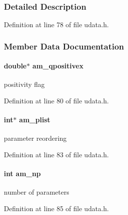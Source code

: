 \subsubsection{Detailed Description}


Definition at line 78 of file udata.\+h.



\subsubsection{Member Data Documentation}
\hypertarget{struct_user_data_a24dcfe2da485ad1964d807779fce2092}{}
\paragraph[{am\+\_\+qpositivex}]{\setlength{\rightskip}{0pt plus 5cm}double$\ast$ am\+\_\+qpositivex}\label{struct_user_data_a24dcfe2da485ad1964d807779fce2092}
positivity flag 

Definition at line 80 of file udata.\+h.

\hypertarget{struct_user_data_a122fcb4f213656e29d30e1e8713fcf1c}{}
\paragraph[{am\+\_\+plist}]{\setlength{\rightskip}{0pt plus 5cm}int$\ast$ am\+\_\+plist}\label{struct_user_data_a122fcb4f213656e29d30e1e8713fcf1c}
parameter reordering 

Definition at line 83 of file udata.\+h.

\hypertarget{struct_user_data_a1b32993ff88dfae4dd2aab311c24cc26}{}
\paragraph[{am\+\_\+np}]{\setlength{\rightskip}{0pt plus 5cm}int am\+\_\+np}\label{struct_user_data_a1b32993ff88dfae4dd2aab311c24cc26}
number of parameters 

Definition at line 85 of file udata.\+h.

\hypertarget{struct_user_data_a1c8d4eb301c60c34dc4870faca7ce5a4}{}
